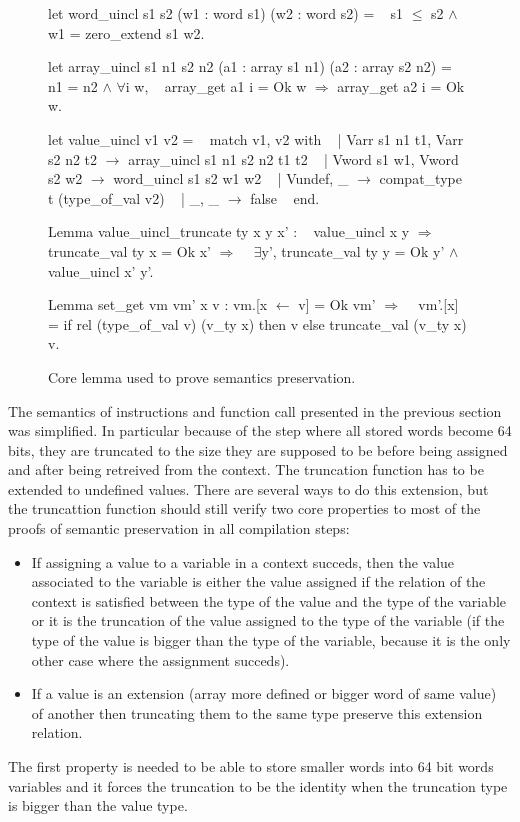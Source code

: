 \documentclass{article}
\begin{document}
\medskip

\begin{figure}[t]
\obeylines\obeyspaces\ttfamily%
let word\_uincl s1 s2 (w1 : word s1) (w2 : word s2) =
~ s1 \(\leq\) s2 \(\wedge\) w1 = zero\_extend s1 w2.

let array\_uincl s1 n1 s2 n2 (a1 : array s1 n1) (a2 : array s2 n2) =
~ n1 = n2 \(\wedge\) \(\forall\)i w,
~   array\_get a1 i = Ok w \(\Longrightarrow\) array\_get a2 i = Ok w.

let value\_uincl v1 v2 =
~ match v1, v2 with
~ | Varr s1 n1 t1, Varr s2 n2 t2 \(\rightarrow\) array\_uincl s1 n1 s2 n2 t1 t2
~ | Vword s1 w1,   Vword s2 w2   \(\rightarrow\) word\_uincl s1 s2 w1 w2
~ | Vundef,        \_             \(\rightarrow\) compat\_type t (type\_of\_val v2)
~ | \_,             \_             \(\rightarrow\) false
~ end.

Lemma value\_uincl\_truncate ty x y x' :
~ value\_uincl x y \(\Longrightarrow\) truncate\_val ty x = Ok x' \(\Longrightarrow\)
~ \(\exists\)y', truncate\_val ty y = Ok y' \(\wedge\) value\_uincl x' y'.

Lemma set\_get vm vm' x v : vm.[x \(\leftarrow\) v] = Ok vm' \(\Longrightarrow\)
~ vm'.[x] = if rel (type\_of\_val v) (v\_ty x) then v else truncate\_val (v\_ty x) v.
\normalfont%
\caption{Core lemma used to prove semantics preservation.}
\end{figure}

The semantics of instructions and function call presented in the previous section
was simplified. In particular because of the step where all stored words become
64 bits, they are truncated to the size they are supposed to be before being
assigned and after being retreived from the context. The truncation function
has to be extended to undefined values. There are several ways to do this
extension, but the truncattion function should still verify two core properties
to most of the proofs of semantic preservation in all compilation steps:
\begin{itemize}
\item If assigning a value to a variable in a context succeds, then the value
  associated to the variable is either the value assigned if the relation of the
  context is satisfied between the type of the value and the type of the
  variable or it is the truncation of the value assigned to the type of the
  variable (if the type of the value is bigger than the type of the variable,
  because it is the only other case where the assignment succeds).
\item If a value is an extension (array more defined or bigger word of same
  value) of another then truncating them to the same type preserve this
  extension relation.
\end{itemize}
The first property is needed to be able to store smaller words into 64 bit words
variables and it forces the truncation to be the identity when the truncation
type is bigger than the value type.
\end{document}
